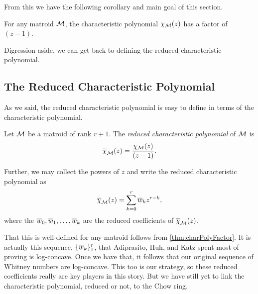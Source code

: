 \documentclass[12pt,oneside]{../../sfsuthesis}
\begin{document}
From this we have the following corollary and main goal of this section.
\begin{corollary}\th\label{thm:charPolyFactor}
    For any matroid \( \mathcal{M} \), the characteristic polynomial \( \chi_{\mathcal{M}}(z) \) has a factor of \( (z - 1) \).
\end{corollary}
Digression aside, we can get back to defining the reduced characteristic polynomial.

\subsection{The Reduced Characteristic Polynomial}
As we said, the reduced characteristic polynomial is easy to define in terms of the characteristic polynomial.
\begin{definition}\label{def:reducedCharPoly}
    Let \( \mathcal{M} \) be a matroid of rank \( r + 1 \).
    The \emph{reduced characteristic polynomial} of \( \mathcal{M} \) is
    \[
        \overline{\chi}_{\mathcal{M}}(z) = \frac{\chi_{\mathcal{M}}(z)}{(z-1)}.
    \]

    Further, we may collect the powers of \( z \) and write the reduced characteristic polynomial as
    \[
        \overline{\chi}_{\mathcal{M}}(z) = \sum_{k=0}^r \overline{w}_k z^{r-k},
    \]
    where the \( \overline{w}_0, \overline{w}_1, \dots, \overline{w}_k \) are the reduced coefficients of \( \overline{\chi}_{\mathcal{M}}(z) \).
\end{definition}
That this is well-defined for any matroid follows from \th\ref{thm:charPolyFactor}.
It is actually this sequence, \(\{\overline{w}_k\}_1^r \), that Adiprasito, Huh, and Katz spent most of \cite{adiprasitoHodgeTheoryCombinatorial2018} proving is log-concave.
Once we have that, it follows that our original sequence of Whitney numbers are log-concave.
This too is our strategy, so these reduced coefficients really are key players in this story.
But we have still yet to link the characteristic polynomial, reduced or not, to the Chow ring.
\end{document}

